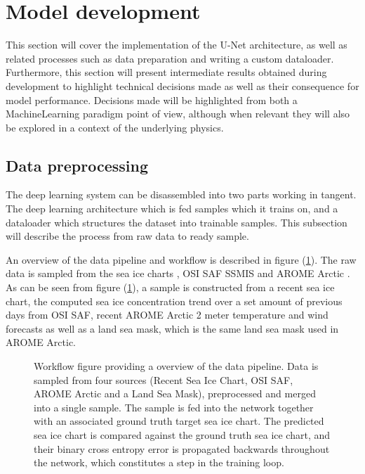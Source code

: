 \documentclass[../main/thesis]{subfiles}
\begin{document}
\section{Model development}
\label{sec:developing a unet}
This section will cover the implementation of the U-Net architecture, as well as related processes such as data preparation and writing a custom dataloader. Furthermore, this section will present intermediate results obtained during development to highlight technical decisions made as well as their consequence for model performance. Decisions made will be highlighted from both a MachineLearning paradigm point of view, although when relevant they will also be explored in a context of the underlying physics.

\subsection{Data preprocessing}
The deep learning system can be disassembled into two parts working in tangent. The deep learning architecture which is fed samples which it trains on, and a dataloader which structures the dataset into trainable samples. This subsection will describe the process from raw data to ready sample.

An overview of the data pipeline and workflow is described in figure (\ref{fig:data_pipeline}). The raw data is sampled from the sea ice charts \citep{Dinessen2020}, OSI SAF SSMIS \citep{Tonboe2017} and AROME Arctic \citep{Mueller2017}. As can be seen from figure (\ref{fig:data_pipeline}), a sample is constructed from a recent sea ice chart, the computed sea ice concentration trend over a set amount of previous days from OSI SAF, recent AROME Arctic 2 meter temperature and wind forecasts as well as a land sea mask, which is the same land sea mask used in AROME Arctic.

\begin{figure}
    \centering
    
    \caption{\label{fig:data_pipeline} Workflow figure providing a overview of the data pipeline. Data is sampled from four sources (Recent Sea Ice Chart, OSI SAF, AROME Arctic and a Land Sea Mask), preprocessed and merged into a single sample. The sample is fed into the network  together with an associated ground truth target sea ice chart. The predicted sea ice chart is compared against the ground truth sea ice chart, and their binary cross entropy error is propagated backwards throughout the network, which constitutes a step in the training loop.}
\end{figure}
\end{document}
